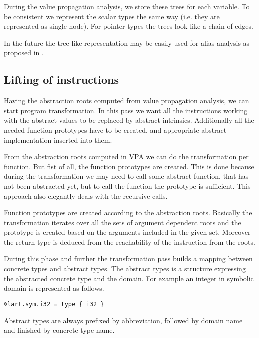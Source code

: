 During the value propagation analysis, we store these trees for each variable.
To be consistent we represent the scalar types the same way (i.e. they are
represented as single node). For pointer types the trees look like a chain of
 edges.

In the future the tree-like representation may be easily used for alias analysis as proposed
in \cite{Rockai15}.

\subsection{Lifting of instructions}
Having the abstraction roots computed from value propagation analysis, we can
start program transformation. In this \LLVM pass we want all the instructions
working with the abstract values to be replaced by abstract intrinsics.
Additionally all the needed function prototypes have to be created, and
appropriate abstract implementation inserted into them.

From the abstraction roots computed in VPA we can do the transformation per
function. But fist of all, the function prototypes are created. This is done
because during the transformation we may need to call some abstract function,
that has not been abstracted yet, but to call the function the prototype is
sufficient. This approach also elegantly deals with the recursive calls.

Function prototypes are created according to the abstraction roots. Basically
the transformation iterates over all the sets of argument dependent roots and
the prototype is created based on the arguments included in the given set.
Moreover the return type is deduced from the reachability of the  instruction
from the roots.

During this phase and further the transformation pass builds a mapping between
concrete types and abstract types. The abstract types is a \LLVM structure
expressing the abstracted concrete type and the domain. For example an integer
in symbolic domain is represented as follows.

\begin{verbatim}
%lart.sym.i32 = type { i32 }
\end{verbatim}

Abstract types are always prefixed by  abbreviation, followed by
domain name and finished by concrete \LLVM type name.

